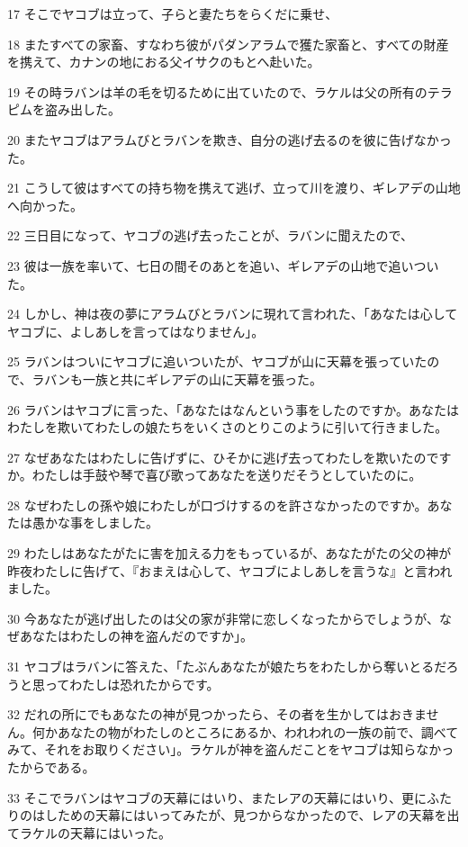 \par 17 そこでヤコブは立って、子らと妻たちをらくだに乗せ、
\par 18 またすべての家畜、すなわち彼がパダンアラムで獲た家畜と、すべての財産を携えて、カナンの地におる父イサクのもとへ赴いた。
\par 19 その時ラバンは羊の毛を切るために出ていたので、ラケルは父の所有のテラピムを盗み出した。
\par 20 またヤコブはアラムびとラバンを欺き、自分の逃げ去るのを彼に告げなかった。
\par 21 こうして彼はすべての持ち物を携えて逃げ、立って川を渡り、ギレアデの山地へ向かった。
\par 22 三日目になって、ヤコブの逃げ去ったことが、ラバンに聞えたので、
\par 23 彼は一族を率いて、七日の間そのあとを追い、ギレアデの山地で追いついた。
\par 24 しかし、神は夜の夢にアラムびとラバンに現れて言われた、「あなたは心してヤコブに、よしあしを言ってはなりません」。
\par 25 ラバンはついにヤコブに追いついたが、ヤコブが山に天幕を張っていたので、ラバンも一族と共にギレアデの山に天幕を張った。
\par 26 ラバンはヤコブに言った、「あなたはなんという事をしたのですか。あなたはわたしを欺いてわたしの娘たちをいくさのとりこのように引いて行きました。
\par 27 なぜあなたはわたしに告げずに、ひそかに逃げ去ってわたしを欺いたのですか。わたしは手鼓や琴で喜び歌ってあなたを送りだそうとしていたのに。
\par 28 なぜわたしの孫や娘にわたしが口づけするのを許さなかったのですか。あなたは愚かな事をしました。
\par 29 わたしはあなたがたに害を加える力をもっているが、あなたがたの父の神が昨夜わたしに告げて、『おまえは心して、ヤコブによしあしを言うな』と言われました。
\par 30 今あなたが逃げ出したのは父の家が非常に恋しくなったからでしょうが、なぜあなたはわたしの神を盗んだのですか」。
\par 31 ヤコブはラバンに答えた、「たぶんあなたが娘たちをわたしから奪いとるだろうと思ってわたしは恐れたからです。
\par 32 だれの所にでもあなたの神が見つかったら、その者を生かしてはおきません。何かあなたの物がわたしのところにあるか、われわれの一族の前で、調べてみて、それをお取りください」。ラケルが神を盗んだことをヤコブは知らなかったからである。
\par 33 そこでラバンはヤコブの天幕にはいり、またレアの天幕にはいり、更にふたりのはしための天幕にはいってみたが、見つからなかったので、レアの天幕を出てラケルの天幕にはいった。
